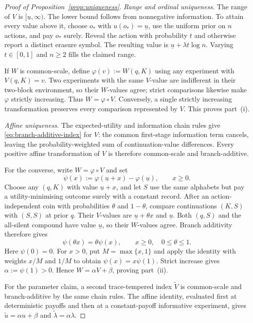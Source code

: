 \documentclass[11pt,a4paper]{article}
\theoremstyle{definition}
\newcommand{\1}{\mathbf 1}
\begin{document}
\begin{proof}[Proof of Proposition~\ref{prop:uniqueness}]
\emph{Range and ordinal uniqueness.}
The range of $V$ is $[\underline u,\infty)$.
The lower bound follows from nonnegative information.  To attain every value
above it, choose $o_*$ with $u(o_*)=\underline u$, use the uniform prior on
$n$ actions, and pay $o_*$ surely.  Reveal the action with probability $t$
and otherwise report a distinct erasure symbol.  The resulting value is
$\underline u+\lambda t\log n$.  Varying $t\in[0,1]$ and $n\ge2$ fills
the claimed range.

If $W$ is common-scale, define $\varphi(v):=W(q,K)$ using any experiment
with $V(q,K)=v$.  Two experiments with the same $V$-value are indifferent
in their two-block environment, so their $W$-values agree; strict comparisons
likewise make $\varphi$ strictly increasing.  Thus $W=\varphi\circ V$.
Conversely, a single strictly increasing transformation preserves every
comparison represented by $V$.  This proves part~\textup{(i)}.

\emph{Affine uniqueness.}
The expected-utility and information chain rules give
\eqref{eq:branch-additive-index} for $V$: the common first-stage information
term cancels, leaving the probability-weighted sum of continuation-value
differences.  Every positive affine transformation of $V$
is therefore common-scale and branch-additive.

For the converse, write $W=\varphi\circ V$ and set
\[
 \psi(x):=\varphi(\underline u+x)-\varphi(\underline u),\qquad x\ge0.
\]
Choose any $(q,K)$ with value $\underline u+x$, and let $S$ use the same
alphabets but pay a utility-minimising outcome surely with a constant record.
After an action-independent coin with probabilities $\theta$ and
$1-\theta$, compare continuations $(K,S)$ with $(S,S)$ at prior $q$.
Their $V$-values are $\underline u+\theta x$ and $\underline u$.
Both $(q,S)$ and the all-silent compound have value $\underline u$,
so their $W$-values agree.  Branch additivity therefore gives
\[
 \psi(\theta x)=\theta\psi(x),\qquad x\ge0,\quad 0\le\theta\le1.
\]
Here $\psi(0)=0$.  For $x>0$, put $M=\max\{x,1\}$ and apply the identity
with weights $x/M$ and $1/M$ to obtain $\psi(x)=x\psi(1)$.
Strict increase gives $\alpha:=\psi(1)>0$.  Hence
$W=\alpha V+\beta$, proving part~\textup{(ii)}.

For the parameter claim, a second trace-tempered index $\widetilde V$ is
common-scale and branch-additive by the same chain rules.  The affine
identity, evaluated first at deterministic payoffs and then at a
constant-payoff informative experiment, gives
$\widetilde u=\alpha u+\beta$ and $\widetilde\lambda=\alpha\lambda$.
\end{proof}
\end{document}
